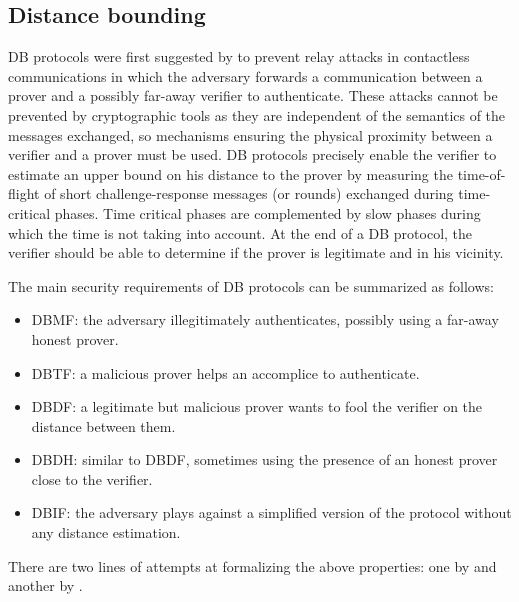\subsection{Distance bounding}%
\label{DistanceBounding}

\Ac{DB} protocols were first suggested by \citet{DistanceBounding} to prevent 
relay attacks in contactless communications in which the adversary forwards a 
communication between a prover and a possibly far-away verifier to authenticate. 
These attacks cannot be prevented by cryptographic tools as they are independent 
of the semantics of the messages exchanged, so mechanisms ensuring the physical 
proximity between a verifier and a prover must be used.
\Ac{DB} protocols precisely enable the verifier to estimate an upper bound on his distance to the prover by measuring the time-of-flight of short challenge-response messages (or rounds) exchanged during time-critical phases. 
Time critical phases are complemented by slow phases during which the time is not taking into account.
At the end of a \Ac{DB} protocol, the verifier should be able to determine if the prover is legitimate and in his vicinity.

The main security requirements of \ac{DB} protocols can be summarized as follows:
\begin{itemize}
  \item \ac{DBMF}: the adversary illegitimately authenticates, possibly using a 
    far-away honest prover.
  \item\ac{DBTF}: a malicious prover helps an accomplice to authenticate.
    \item \ac{DBDF}: a legitimate but malicious prover wants to fool the verifier on the distance between them.
  \item \ac{DBDH}: similar to \ac{DBDF}, sometimes using the presence of an honest prover close to the verifier.
  \item \ac{DBIF}: the adversary plays against a simplified version of the protocol without any distance estimation.
\end{itemize}
There are two lines of attempts at formalizing the above properties: one by \citet{DB-BMV} and another by \citet{DB-DFKO}.

